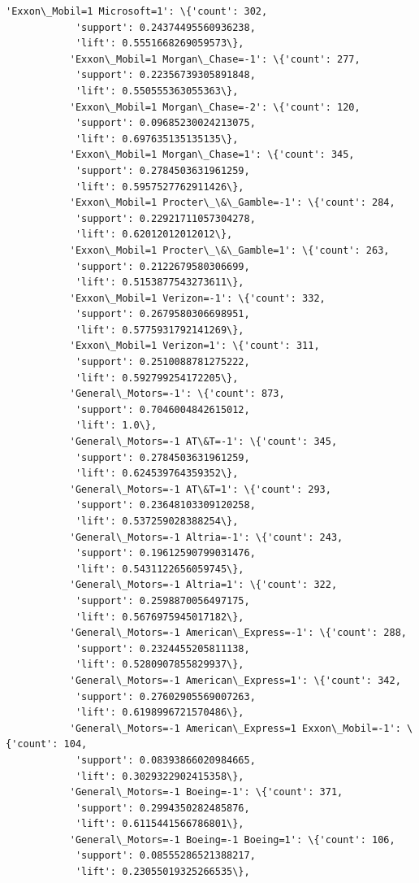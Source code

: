 \documentclass[11pt]{article}
\begin{document}
\begin{Verbatim}[commandchars=\\\{\}]
           'Exxon\_Mobil=1 Microsoft=1': \{'count': 302,
            'support': 0.24374495560936238,
            'lift': 0.5551668269059573\},
           'Exxon\_Mobil=1 Morgan\_Chase=-1': \{'count': 277,
            'support': 0.22356739305891848,
            'lift': 0.550555363055363\},
           'Exxon\_Mobil=1 Morgan\_Chase=-2': \{'count': 120,
            'support': 0.09685230024213075,
            'lift': 0.697635135135135\},
           'Exxon\_Mobil=1 Morgan\_Chase=1': \{'count': 345,
            'support': 0.2784503631961259,
            'lift': 0.5957527762911426\},
           'Exxon\_Mobil=1 Procter\_\&\_Gamble=-1': \{'count': 284,
            'support': 0.22921711057304278,
            'lift': 0.62012012012012\},
           'Exxon\_Mobil=1 Procter\_\&\_Gamble=1': \{'count': 263,
            'support': 0.2122679580306699,
            'lift': 0.5153877543273611\},
           'Exxon\_Mobil=1 Verizon=-1': \{'count': 332,
            'support': 0.2679580306698951,
            'lift': 0.5775931792141269\},
           'Exxon\_Mobil=1 Verizon=1': \{'count': 311,
            'support': 0.2510088781275222,
            'lift': 0.592799254172205\},
           'General\_Motors=-1': \{'count': 873,
            'support': 0.7046004842615012,
            'lift': 1.0\},
           'General\_Motors=-1 AT\&T=-1': \{'count': 345,
            'support': 0.2784503631961259,
            'lift': 0.624539764359352\},
           'General\_Motors=-1 AT\&T=1': \{'count': 293,
            'support': 0.23648103309120258,
            'lift': 0.537259028388254\},
           'General\_Motors=-1 Altria=-1': \{'count': 243,
            'support': 0.19612590799031476,
            'lift': 0.5431122656059745\},
           'General\_Motors=-1 Altria=1': \{'count': 322,
            'support': 0.2598870056497175,
            'lift': 0.5676975945017182\},
           'General\_Motors=-1 American\_Express=-1': \{'count': 288,
            'support': 0.2324455205811138,
            'lift': 0.5280907855829937\},
           'General\_Motors=-1 American\_Express=1': \{'count': 342,
            'support': 0.27602905569007263,
            'lift': 0.6198996721570486\},
           'General\_Motors=-1 American\_Express=1 Exxon\_Mobil=-1': \{'count': 104,
            'support': 0.08393866020984665,
            'lift': 0.3029322902415358\},
           'General\_Motors=-1 Boeing=-1': \{'count': 371,
            'support': 0.2994350282485876,
            'lift': 0.6115441566786801\},
           'General\_Motors=-1 Boeing=-1 Boeing=1': \{'count': 106,
            'support': 0.08555286521388217,
            'lift': 0.23055019325266535\},

\end{Verbatim}
\end{document}
